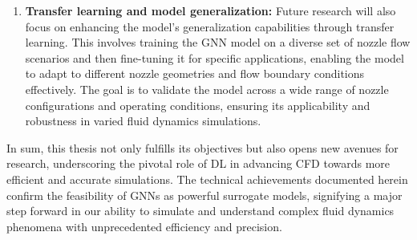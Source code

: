 \begin{enumerate}
    \item \textbf{Transfer learning and model generalization:} Future research will also focus on enhancing the model's generalization capabilities through transfer learning. This involves training the GNN model on a diverse set of nozzle flow scenarios and then fine-tuning it for specific applications, enabling the model to adapt to different nozzle geometries and flow boundary conditions effectively. The goal is to validate the model across a wide range of nozzle configurations and operating conditions, ensuring its applicability and robustness in varied fluid dynamics simulations.
       
\end{enumerate}
In sum, this thesis not only fulfills its objectives but also opens new avenues for research, underscoring the pivotal role of DL in advancing CFD towards more efficient and accurate simulations. The technical achievements documented herein confirm the feasibility of GNNs as powerful surrogate models, signifying a major step forward in our ability to simulate and understand complex fluid dynamics phenomena with unprecedented efficiency and precision.




